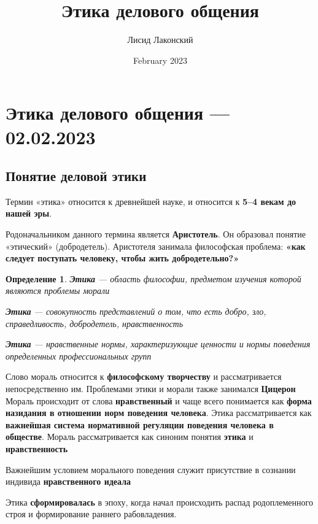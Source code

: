 \documentclass[a4paper,14pt]{extarticle}
\title{Этика делового общения}
\author{Лисид Лаконский}
\date{February 2023}
\newtheorem{definition}{Определение}
\begin{document}
\raggedright

\maketitle
\tableofcontents
\pagebreak

\section{Этика делового общения — 02.02.2023}

\subsection{Понятие деловой этики}

Термин «этика» относится к древнейшей науке, и относится к \textbf{5–4 векам до нашей эры}.

Родоначальником данного термина является \textbf{Аристотель}. Он образовал понятие «этический» (добродетель). Аристотеля занимала философская проблема: \textbf{«как следует поступать человеку, чтобы жить добродетельно?»}

\begin{definition}
\textbf{Этика} — область философии, предметом изучения которой являются проблемы морали

\textbf{Этика} — совокупность представлений о том, что есть добро, зло, справедливость, добродетель, нравственность

\textbf{Этика} — нравственные нормы, характеризующие ценности и нормы поведения определенных профессиональных групп
\end{definition}

Слово мораль относится к \textbf{философскому творчеству} и рассматривается непосредственно им. Проблемами этики и морали также занимался \textbf{Цицерон} Мораль происходит от слова \textbf{нравственный} и чаще всего понимается как \textbf{форма назидания в отношении норм поведения человека}. Этика рассматривается как \textbf{важнейшая система нормативной регуляции поведения человека в обществе}. Мораль рассматривается как синоним понятия \textbf{этика} и \textbf{нравственность}

\hfill

Важнейшим условием морального поведения служит присутствие в сознании индивида \textbf{нравственного идеала}

Этика \textbf{сформировалась} в эпоху, когда начал происходить распад родоплеменного строя и формирование раннего рабовладения.
\end{document}
